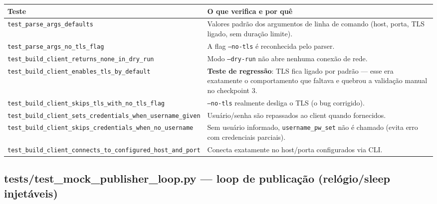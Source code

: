 \documentclass[10pt,a4paper]{article}
\begin{document}
\begin{center}
\begin{longtable}{L{5cm}L{9.5cm}}
\toprule
\textbf{Teste} & \textbf{O que verifica e por quê} \\
\midrule
\endhead
\texttt{test\_\allowbreak parse\_\allowbreak args\_\allowbreak defaults} & Valores padrão dos argumentos de linha de comando (host, porta, TLS ligado, sem duração limite). \\
\texttt{test\_\allowbreak parse\_\allowbreak args\_\allowbreak no\_\allowbreak tls\_\allowbreak flag} & A flag \texttt{--no-tls} é reconhecida pelo parser. \\
\texttt{test\_\allowbreak build\_\allowbreak client\_\allowbreak returns\_\allowbreak none\_\allowbreak in\_\allowbreak dry\_\allowbreak run} & Modo \texttt{--dry-run} não abre nenhuma conexão de rede. \\
\texttt{test\_\allowbreak build\_\allowbreak client\_\allowbreak enables\_\allowbreak tls\_\allowbreak by\_\allowbreak default} & \textbf{Teste de regressão}: TLS fica ligado por padrão — esse era exatamente o comportamento que faltava e quebrou a validação manual no checkpoint 3. \\
\texttt{test\_\allowbreak build\_\allowbreak client\_\allowbreak skips\_\allowbreak tls\_\allowbreak with\_\allowbreak no\_\allowbreak tls\_\allowbreak flag} & \texttt{--no-tls} realmente desliga o TLS (o bug corrigido). \\
\texttt{test\_\allowbreak build\_\allowbreak client\_\allowbreak sets\_\allowbreak credentials\_\allowbreak when\_\allowbreak username\_\allowbreak given} & Usuário/senha são repassados ao client quando fornecidos. \\
\texttt{test\_\allowbreak build\_\allowbreak client\_\allowbreak skips\_\allowbreak credentials\_\allowbreak when\_\allowbreak no\_\allowbreak username} & Sem usuário informado, \texttt{username\_\allowbreak pw\_\allowbreak set} não é chamado (evita erro com credenciais parciais). \\
\texttt{test\_\allowbreak build\_\allowbreak client\_\allowbreak connects\_\allowbreak to\_\allowbreak configured\_\allowbreak host\_\allowbreak and\_\allowbreak port} & Conecta exatamente no host/porta configurados via CLI. \\
\bottomrule
\end{longtable}
\end{center}

\subsection{tests/test\_\allowbreak mock\_\allowbreak publisher\_\allowbreak loop.py --- loop de publicação (relógio/sleep injetáveis)}
\end{document}
